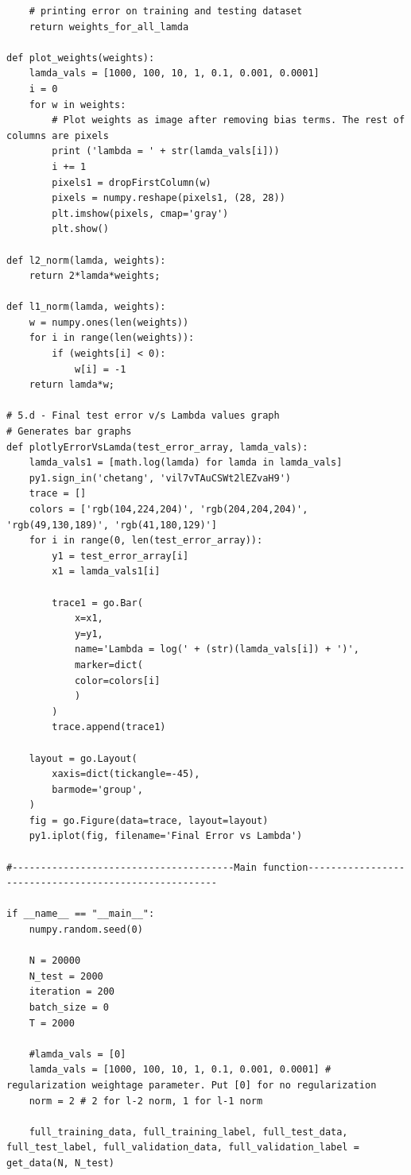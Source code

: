 \documentclass{article}
\begin{document}
\begin{lstlisting}
    # printing error on training and testing dataset
    return weights_for_all_lamda
    
def plot_weights(weights):
    lamda_vals = [1000, 100, 10, 1, 0.1, 0.001, 0.0001]
    i = 0
    for w in weights:
        # Plot weights as image after removing bias terms. The rest of columns are pixels
        print ('lambda = ' + str(lamda_vals[i]))
        i += 1
        pixels1 = dropFirstColumn(w)
        pixels = numpy.reshape(pixels1, (28, 28))
        plt.imshow(pixels, cmap='gray')
        plt.show()    
    
def l2_norm(lamda, weights):
    return 2*lamda*weights;
    
def l1_norm(lamda, weights):
    w = numpy.ones(len(weights))
    for i in range(len(weights)):
        if (weights[i] < 0):        
            w[i] = -1
    return lamda*w;
    
# 5.d - Final test error v/s Lambda values graph
# Generates bar graphs
def plotlyErrorVsLamda(test_error_array, lamda_vals):
    lamda_vals1 = [math.log(lamda) for lamda in lamda_vals]
    py1.sign_in('chetang', 'vil7vTAuCSWt2lEZvaH9')
    trace = []
    colors = ['rgb(104,224,204)', 'rgb(204,204,204)', 'rgb(49,130,189)', 'rgb(41,180,129)']    
    for i in range(0, len(test_error_array)):
        y1 = test_error_array[i]
        x1 = lamda_vals1[i]
        
        trace1 = go.Bar(
            x=x1,
            y=y1,
            name='Lambda = log(' + (str)(lamda_vals[i]) + ')',
            marker=dict(
            color=colors[i]
            )
        )
        trace.append(trace1)
    
    layout = go.Layout(
        xaxis=dict(tickangle=-45),
        barmode='group',
    )
    fig = go.Figure(data=trace, layout=layout)
    py1.iplot(fig, filename='Final Error vs Lambda')
    
#---------------------------------------Main function------------------------------------------------------
        
if __name__ == "__main__":        
    numpy.random.seed(0)
    
    N = 20000
    N_test = 2000
    iteration = 200
    batch_size = 0
    T = 2000    
    
    #lamda_vals = [0]
    lamda_vals = [1000, 100, 10, 1, 0.1, 0.001, 0.0001] # regularization weightage parameter. Put [0] for no regularization
    norm = 2 # 2 for l-2 norm, 1 for l-1 norm
    
    full_training_data, full_training_label, full_test_data, full_test_label, full_validation_data, full_validation_label = get_data(N, N_test)
 

\end{lstlisting}
\end{document}

